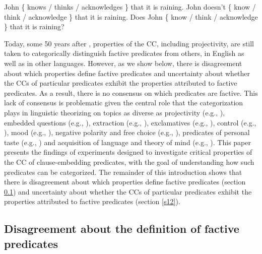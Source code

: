 \documentclass[11pt,fleqn]{article}
\newcommand{\6}{\mbox{$[\hspace*{-.6mm}[$}}
\newcommand{\9}{\mbox{$]\hspace*{-.6mm}]$}}
\begin{document}
\begin{exe}
\ex\label{kk1}
\begin{xlist}
\ex John \{ knows / thinks / acknowledges \} that it is raining.
\ex John doesn't \{ know / think / acknowledge \} that it is raining.
\ex Does John \{ know / think / acknowledge \} that it is raining?
\end{xlist}
\end{exe}
Today, some 50 years after \citealt{kiparsky-kiparsky70}, properties of the CC, including projectivity, are still taken to categorically distinguish factive predicates from others, in English as well as in other languages. However, as we show below, there is disagreement about which properties define factive predicates and uncertainty about whether the CCs of particular predicates exhibit the properties attributed to factive predicates. As a result, there is no consensus on which predicates are factive. This lack of consensus is problematic given the central role that the categorization plays in linguistic theorizing on topics as diverse as projectivity (e.g., \citealt{karttunen-peters79,vds92}), embedded questions (e.g., \citealt{hintikka1975,guerzoni-sharvit2007,spector-egre2015}), extraction (e.g., \citealt{hukari-levine1995,rooryck2000,abrusan2014}), exclamatives (e.g., \citealt{zanuttini-portner2003}), control (e.g., \citealt{landau2001}), mood (e.g., \citealt{van-gelderen2004,givon95,heycock2006}), negative polarity and free choice (e.g., \citealt{giannakidou1998,giannakidou2001}), predicates of personal taste (e.g., \citealt{lasersohn2009}) and acquisition of language and theory of mind (e.g., \citealt{devillers2005}). 
This paper presents the findings of experiments designed to investigate critical properties of the CC of clause-embedding predicates, with the goal of understanding how such predicates can be categorized. The remainder of this introduction shows that there is disagreement about which properties define factive predicates (section \ref{s11}) and uncertainty about whether the CCs of particular predicates exhibit the properties attributed to factive predicates (section \ref{s12}).

\subsection{Disagreement about the definition of factive predicates}\label{s11}
\end{document}
